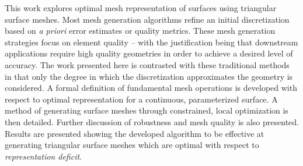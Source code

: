 This work explores optimal mesh representation of surfaces using 
triangular surface meshes. 
Most mesh generation algorithms refine an initial discretization based on 
{\it a priori} error estimates or quality metrics. These mesh generation 
strategies focus on element quality -- with the justification being that 
downstream applications require high quality geometries in order to 
achieve a desired level of accuracy. The work presented here is contrasted 
with these traditional methods in that only the degree in which the 
discretization approximates the geometry is considered. A formal 
definition of fundamental mesh operations is developed with respect to 
optimal representation for a continuous, parameterized surface. A method 
of generating surface meshes through constrained, local optimization is 
then detailed. Further discussion of robustness and mesh quality is also 
presented. Results are presented showing the developed algorithm to be 
effective at generating triangular surface meshes which are optimal with 
respect to {\it representation deficit}.
